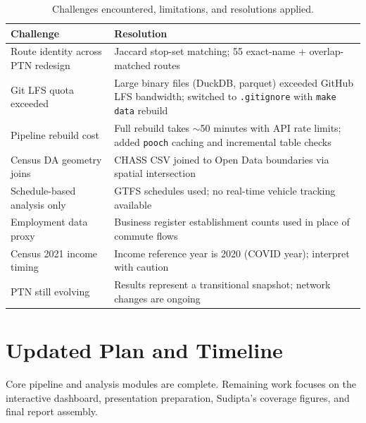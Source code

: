 \documentclass[11pt]{article}
\renewcommand{\arraystretch}{1.05}
\begin{document}
\begin{table}[H]
\centering\scriptsize
\renewcommand{\arraystretch}{1.05}
\begin{tabularx}{\textwidth}{@{}l X@{}}
\toprule
\textbf{Challenge} & \textbf{Resolution} \\
\midrule
Route identity across PTN redesign & Jaccard stop-set matching; 55 exact-name + overlap-matched routes \\
Git LFS quota exceeded & Large binary files (DuckDB, parquet) exceeded GitHub LFS bandwidth; switched to \texttt{.gitignore} with \texttt{make data} rebuild \\
Pipeline rebuild cost & Full rebuild takes $\sim$50 minutes with API rate limits; added \texttt{pooch} caching and incremental table checks \\
Census DA geometry joins & CHASS CSV joined to Open Data boundaries via spatial intersection \\
Schedule-based analysis only & GTFS schedules used; no real-time vehicle tracking available \\
Employment data proxy & Business register establishment counts used in place of commute flows \\
Census 2021 income timing & Income reference year is 2020 (COVID year); interpret with caution \\
PTN still evolving & Results represent a transitional snapshot; network changes are ongoing \\
\bottomrule
\end{tabularx}
\caption{Challenges encountered, limitations, and resolutions applied.}
\label{tab:challenges}
\end{table}

\vspace{-0.3em}

\section{Updated Plan and Timeline}

Core pipeline and analysis modules are complete.  Remaining work focuses on the interactive dashboard, presentation preparation, Sudipta's coverage figures, and final report assembly.
\end{document}
